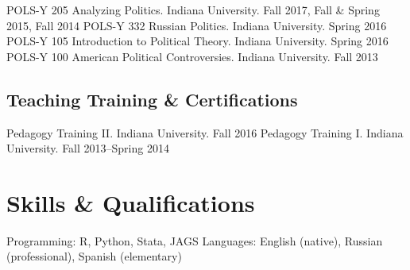 \documentclass[11pt,]{article}
\begin{document}
\vspace{-2mm}

POLS-Y 205 Analyzing Politics. Indiana University. \hfill Fall 2017,
Fall \& Spring 2015, Fall 2014 \break POLS-Y 332 Russian Politics.
Indiana University. \hfill Spring 2016 \break POLS-Y 105 Introduction to
Political Theory. Indiana University. \hfill Spring 2016 \break POLS-Y
100 American Political Controversies. Indiana University. \hfill Fall
2013 \break

\vspace{-7mm}

\hypertarget{teaching-training-certifications}{%
\subsection{Teaching Training \&
Certifications}\label{teaching-training-certifications}}

\vspace{-2mm}

Pedagogy Training II. Indiana University. \hfill Fall 2016 \break
Pedagogy Training I. Indiana University. \hfill Fall 2013--Spring 2014
\break

\vspace{-5mm}

\hypertarget{skills-qualifications}{%
\section{Skills \& Qualifications}\label{skills-qualifications}}

\vspace{-2mm}

Programming: \textsf{R}, Python, Stata, JAGS \hfill \break Languages:
English (native), Russian (professional), Spanish (elementary)

\vspace{-1mm}
\end{document}
